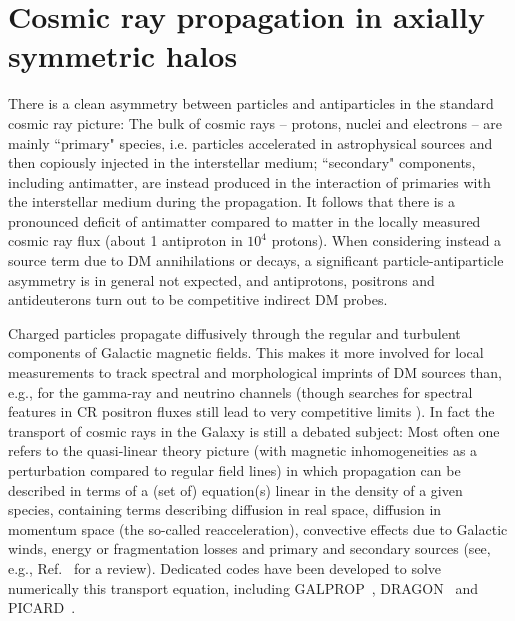 \section{Cosmic ray propagation in axially symmetric halos}

There is a clean asymmetry between particles and antiparticles in the standard cosmic ray picture:
The bulk of cosmic rays -- protons, nuclei and electrons -- are mainly ``primary" species, i.e. particles
accelerated in astrophysical sources and then copiously injected in the interstellar medium;
``secondary" components, including antimatter, are instead produced in the interaction of primaries 
with the interstellar
medium during the propagation. It follows that there is a pronounced deficit of antimatter compared to matter 
in the locally measured cosmic ray flux (about 1 antiproton in $10^4$ protons). When considering instead a
source term due to DM annihilations or decays, a significant particle-antiparticle asymmetry is in general
not expected, and antiprotons, positrons and antideuterons turn out to be competitive indirect DM probes.

Charged particles propagate diffusively through the regular and turbulent components of Galactic magnetic 
fields. This makes it more involved for local measurements to track spectral and morphological imprints of 
DM sources than, e.g., for the gamma-ray and neutrino channels (though searches for spectral features
in CR positron fluxes still lead to very competitive limits \cite{Bergstrom:2013jra}).
In fact the transport of cosmic rays in the Galaxy is still a debated
subject: Most often one refers to the quasi-linear theory picture (with magnetic inhomogeneities as a perturbation 
compared to regular field lines) in which propagation can be described in terms of a (set of) equation(s) linear
in the density of a given species, containing terms describing diffusion in real space, diffusion in momentum
space (the so-called reacceleration), convective effects due to Galactic winds, energy or fragmentation
losses and primary and secondary sources (see, e.g., Ref.~\cite{Strong:2007nh} for a review).
Dedicated codes have been developed to solve numerically this transport equation, including GALPROP~\cite{Strong:1998pw}, DRAGON~\cite{Evoli:2016xgn} and PICARD~\cite{Kissmann:2014sia}. 

